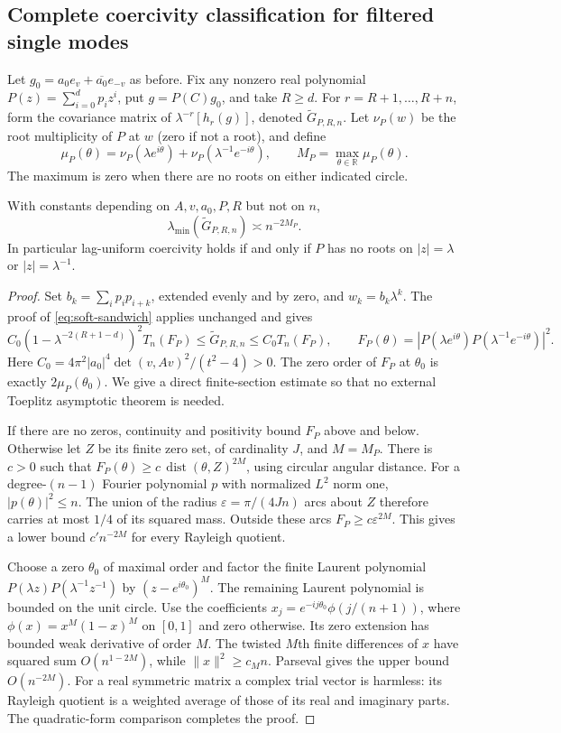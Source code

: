 \subsection{Complete coercivity classification for filtered single modes}
Let $g_0=a_0e_v+\overline{a_0}e_{-v}$ as before. Fix any nonzero real
polynomial $P(z)=\sum_{i=0}^dp_iz^i$, put $g=P(C)g_0$, and take $R\ge d$.
For $r=R+1,\ldots,R+n$, form the covariance matrix of
$\lambda^{-r}[h_r(g)]$, denoted $\widetilde G_{P,R,n}$.
Let $\nu_P(w)$ be the root multiplicity of $P$ at $w$ (zero if not a root),
and define
\[
 \mu_P(\theta)=\nu_P(\lambda e^{i\theta})+
                 \nu_P(\lambda^{-1}e^{-i\theta}),\qquad
 M_P=\max_{\theta\in\mathbb R}\mu_P(\theta).
\]
The maximum is zero when there are no roots on either indicated circle.
\begin{theorem}\label{thm:root-circle}
With constants depending on $A,v,a_0,P,R$ but not on $n$,
\[
 \lambda_{\min}(\widetilde G_{P,R,n})\asymp n^{-2M_P}.
\]
In particular lag-uniform coercivity holds if and only if $P$ has no roots
on $|z|=\lambda$ or $|z|=\lambda^{-1}$.
\end{theorem}
\begin{proof}
Set $b_k=\sum_i p_ip_{i+k}$, extended evenly and by zero, and $w_k=b_k\lambda^k$.
The proof of \eqref{eq:soft-sandwich} applies unchanged and gives
\[
 C_0(1-\lambda^{-2(R+1-d)})^2T_n(F_P)
 \le\widetilde G_{P,R,n}\le C_0T_n(F_P),\qquad
 F_P(\theta)=|P(\lambda e^{i\theta})P(\lambda^{-1}e^{-i\theta})|^2.
\]
Here $C_0=4\pi^2|a_0|^4\det(v,Av)^2/(t^2-4)>0$.
The zero order of $F_P$ at $\theta_0$ is exactly $2\mu_P(\theta_0)$.
We give a direct finite-section estimate so that no external Toeplitz
asymptotic theorem is needed.

If there are no zeros, continuity and positivity bound $F_P$ above and below.
Otherwise let $Z$ be its finite zero set, of cardinality $J$, and $M=M_P$.
There is $c>0$ such that
$F_P(\theta)\ge c\,\operatorname{dist}(\theta,Z)^{2M}$, using circular
angular distance. For a degree-$(n-1)$ Fourier polynomial $p$ with normalized
$L^2$ norm one, $|p(\theta)|^2\le n$. The union of the radius
$\varepsilon=\pi/(4Jn)$ arcs about $Z$ therefore carries at most $1/4$ of
its squared mass. Outside these arcs $F_P\ge c\varepsilon^{2M}$.
This gives a lower bound $c'n^{-2M}$ for every Rayleigh quotient.

Choose a zero $\theta_0$ of maximal order and factor the finite Laurent
polynomial $P(\lambda z)P(\lambda^{-1}z^{-1})$ by
$(z-e^{i\theta_0})^M$. The remaining Laurent polynomial is bounded on the
unit circle. Use the coefficients
$x_j=e^{-ij\theta_0}\phi(j/(n+1))$, where
$\phi(x)=x^M(1-x)^M$ on $[0,1]$ and zero otherwise.
Its zero extension has bounded weak derivative of order $M$. The twisted
$M$th finite differences of $x$ have squared sum $O(n^{1-2M})$, while
$\|x\|^2\ge c_Mn$. Parseval gives the upper bound $O(n^{-2M})$.
For a real symmetric matrix a complex trial vector is harmless: its Rayleigh
quotient is a weighted average of those of its real and imaginary parts.
The quadratic-form comparison completes the proof.
\end{proof}
